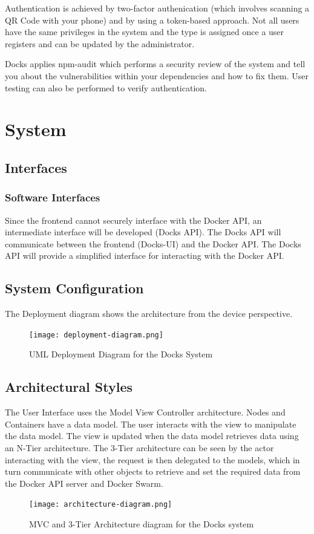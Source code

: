 \documentclass[]{article}
\begin{document}
Authentication is achieved by two-factor authenication (which involves scanning a QR Code with your phone) and by using a token-based approach. Not all users have the same privileges in the system and the type is assigned once a user registers and can be updated by the administrator.

Docks applies npm-audit which performs a security review of the system and tell you about the vulnerabilities within your dependencies and how to fix them. User testing can also be performed to verify authentication.

\section{System}
\subsection{Interfaces}
\subsubsection{Software Interfaces}
Since the frontend cannot securely interface with the Docker API,
an intermediate interface will be developed (Docks API).
The Docks API will communicate between the frontend (Docks-UI) and
the Docker API. The Docks API will provide a simplified interface for
interacting with the Docker API.


\subsection{System Configuration}
The Deployment diagram shows the architecture from the device perspective.

\begin{figure}[H]
	\centering
	\texttt{[image: deployment-diagram.png]}
	\caption{UML Deployment Diagram for the Docks System}
\end{figure}

\subsection{Architectural Styles}

The User Interface uses the Model View Controller architecture.
Nodes and Containers have a data model.
The user interacts with the view to manipulate the data model.
The view is updated when the data model retrieves data using an N-Tier architecture.
The 3-Tier architecture can be seen by the actor interacting with the view,
the request is then delegated to the models, which in turn
communicate with other objects to retrieve and set the required data from
the Docker API server and Docker Swarm.

\begin{figure}[h]
	\centering
	\texttt{[image: architecture-diagram.png]}
	\caption{MVC and 3-Tier Architecture diagram for the Docks system}
\end{figure}
\end{document}
